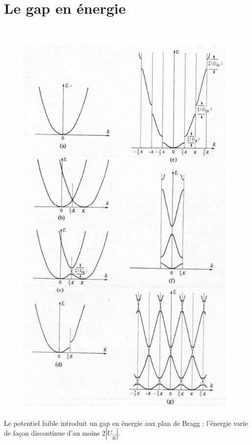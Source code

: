 	\section{Le gap en énergie}\ 
	\begin{figure}
	\vspace{-1.5cm}
	\includegraphics[scale=0.6]{ch5/image3.png}
	\end{figure}
	Le potentiel faible introduit un gap en énergie aux plan de Bragg : l'énergie 
	varie de façon discontinue d'au moins $2|U_{\vec{K}}|$.\\
		
